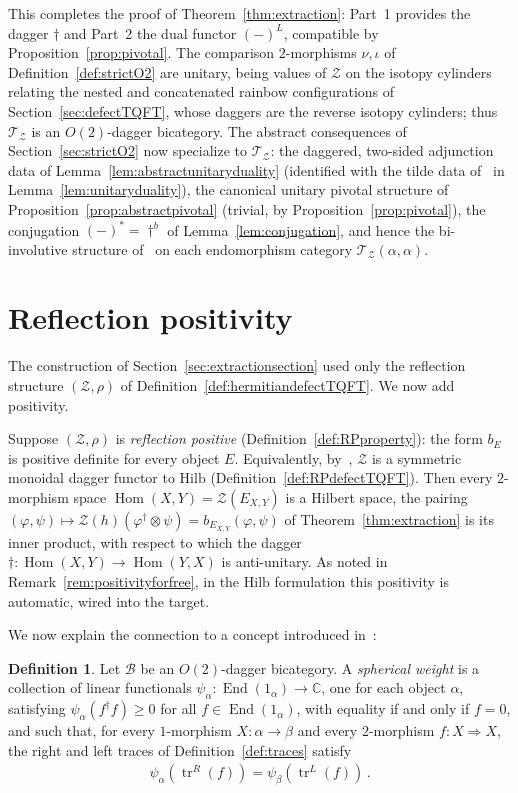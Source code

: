 \documentclass[11pt]{article}
\theoremstyle{definition}
\newtheorem{definition}[theorem]{Definition}
\newcommand{\cB}{\mathcal{B}}
\newcommand{\cT}{\mathcal{T}}
\newcommand{\cZ}{\mathcal{Z}}
\newcommand{\bC}{\mathbb{C}}
\newcommand{\Hilb}{\mathrm{Hilb}}
\newcommand{\Or}{O} %
\newcommand{\dg}{\dagger}
\begin{document}
This completes the proof of Theorem~\ref{thm:extraction}: Part~1 provides the dagger $\dg$ and Part~2 the dual functor $(-)^L$, compatible by Proposition~\ref{prop:pivotal}. The comparison $2$-morphisms $\nu, \iota$ of Definition~\ref{def:strictO2} are unitary, being values of $\cZ$ on the isotopy cylinders relating the nested and concatenated rainbow configurations of Section~\ref{sec:defectTQFT}, whose daggers are the reverse isotopy cylinders; thus $\cT_\cZ$ is an $\Or(2)$-dagger bicategory. The abstract consequences of Section~\ref{sec:strictO2} now specialize to $\cT_\cZ$: the daggered, two-sided adjunction data of Lemma~\ref{lem:abstractunitaryduality} (identified with the tilde data of~\cite{Car16} in Lemma~\ref{lem:unitaryduality}), the canonical unitary pivotal structure of Proposition~\ref{prop:abstractpivotal} (trivial, by Proposition~\ref{prop:pivotal}), the conjugation $(-)^* = \dg^b$ of Lemma~\ref{lem:conjugation}, and hence the bi-involutive structure of~\cite{HP17} on each endomorphism category $\cT_\cZ(\alpha,\alpha)$.



\section{Reflection positivity}
\label{sec:positivity}

The construction of Section~\ref{sec:extractionsection} used only the reflection structure $(\cZ, \rho)$ of Definition~\ref{def:hermitiandefectTQFT}. We now add positivity.

Suppose $(\cZ, \rho)$ is \emph{reflection positive} (Definition~\ref{def:RPproperty}): the form $b_E$ is positive definite for every object $E$. Equivalently, by~\cite[Thm.~2.3.41]{Ste23}, $\cZ$ is a symmetric monoidal dagger functor to $\Hilb$ (Definition~\ref{def:RPdefectTQFT}). Then every $2$-morphism space $\operatorname{Hom}(X,Y) = \cZ(E_{X,Y})$ is a Hilbert space, the pairing $(\varphi, \psi) \mapsto \cZ(h)(\varphi^\dg \otimes \psi) = b_{E_{X,Y}}(\varphi, \psi)$ of Theorem~\ref{thm:extraction} is its inner product, with respect to which the dagger $\dg \colon \operatorname{Hom}(X,Y) \to \operatorname{Hom}(Y,X)$ is anti-unitary. As noted in Remark~\ref{rem:positivityforfree}, in the $\Hilb$ formulation this positivity is automatic, wired into the target. 

We now explain the connection to a concept introduced in~\cite{CHFHS24}: 
\begin{definition} 
	Let $\cB$ be an $\Or(2)$-dagger bicategory. A \emph{spherical weight} is a collection of linear functionals $\psi_\alpha \colon \operatorname{End}(1_\alpha) \to \bC$, one for each object $\alpha$, satisfying $\psi_\alpha(f^\dagger f) \geq 0$ for all $f \in \operatorname{End}(1_\alpha)$, with equality if and only if $f = 0$, and such that, for every $1$-morphism $X \colon \alpha \to \beta$ and every $2$-morphism $f \colon X \Rightarrow X$, the right and left traces of Definition~\ref{def:traces} satisfy
	\begin{align}
		\psi_\alpha (\operatorname{tr}^R(f)) = \psi_\beta (\operatorname{tr}^L(f)) \, .
	\end{align}
\end{definition}
\end{document}

